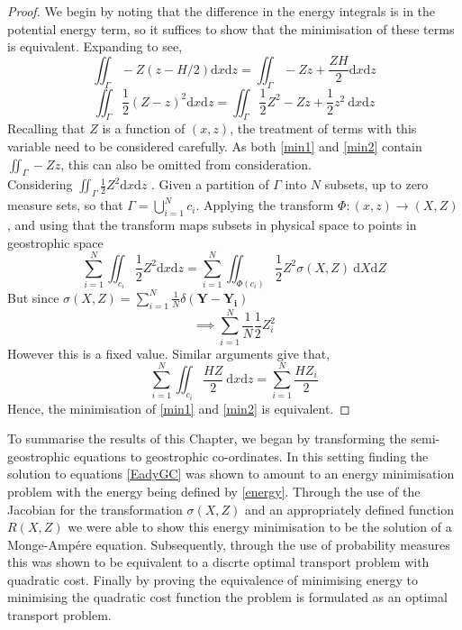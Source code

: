 \begin{proof}
	We begin by noting that the difference in the energy integrals is in the potential energy term, so it suffices to show that the minimisation of these terms is equivalent. Expanding to see,
	\begin{equation}
	\iint_{\Gamma} - Z\left(z - H/2\right)\textrm{d}x\textrm{d}z = \iint_{\Gamma} - Zz + \frac{ZH}{2}\textrm{d}x\textrm{d}z
	\label{min1}
	\end{equation} 
	\begin{equation}
	\iint_{\Gamma} \frac{1}{2}\left(Z - z\right)^2\textrm{d}x\textrm{d}z = \iint_{\Gamma} \frac{1}{2}Z^2 - Zz + \frac{1}{2} z^2 \ \textrm{d}x\textrm{d}z
	\label{min2}  
	\end{equation}
	Recalling that $Z$ is a function of $(x,z)$, the treatment of terms with this variable need to be considered carefully. As both \ref{min1} and \ref{min2} contain $\iint_{\Gamma} - Zz$, this can also be omitted from consideration.\\
	\linebreak
	Considering $\iint_{\Gamma} \frac{1}{2}Z^2\textrm{d}x\textrm{d}z$ . Given a partition of $\Gamma$ into $N$ subsets, up to zero measure sets, so that $\Gamma = \bigcup_{i=1}^N c_i$. Applying the transform $\Phi: (x,z) \rightarrow (X,Z)$, and using that the transform maps subsets in physical space to points in geostrophic space
	\begin{equation*}
		\sum_{i=1}^N \iint_{c_i} \frac{1}{2}Z^2\textrm{d}x\textrm{d}z = \sum_{i=1}^N \iint_{\Phi(c_i)} \frac{1}{2}Z^2\sigma(X,Z) \ \textrm{d}X\textrm{d}Z 
	\end{equation*}
	But since $\sigma(X,Z) = \sum_{i=1}^{N} \frac{1}{N} \delta(\bm{Y}-\bm{Y_i})$
	\begin{equation*}
		\implies \sum_{i=1}^N \frac{1}{N} \frac{1}{2}Z_i^2
	\end{equation*}
	However this is a fixed value. Similar arguments give that,
	\begin{equation*}
		\sum_{i=1}^N \iint_{c_i} \frac{HZ}{2} \ \textrm{d}x\textrm{d}z = \sum_{i=1}^N \frac{HZ_i}{2}
	\end{equation*}
	Hence, the minimisation of \ref{min1} and \ref{min2} is equivalent.
\end{proof}
To summarise the results of this Chapter, we began by transforming the semi-geostrophic equations to geostrophic co-ordinates. In this setting finding the solution to equations \ref{EadyGC} was shown to amount to an energy minimisation problem with the energy being defined by \ref{energy}. Through the use of the Jacobian for the transformation $\sigma(X,Z)$ and an appropriately defined function $R(X,Z)$ we were able to show this energy minimisation to be the solution of a Monge-Amp\'{e}re equation. Subsequently, through the use of probability measures this was shown to be equivalent to a discrte optimal transport problem with quadratic cost. Finally by proving the equivalence of minimising energy to minimising the quadratic cost function the problem is formulated as an optimal transport problem.
